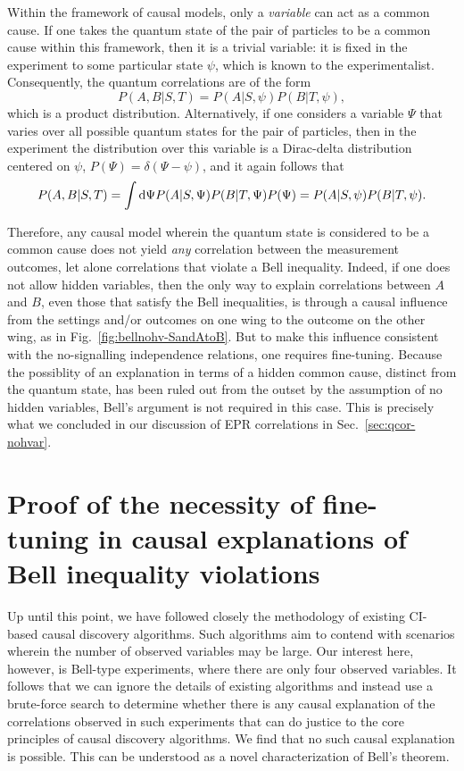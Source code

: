 \documentclass[12pt,onecolumn,nofootinbib]{revtex4-2}
\begin{document}
Within the framework of causal models, only a {\em variable} can act as a common cause. If one takes the quantum state of the pair of particles  to be a common cause within this framework, then it is a trivial variable: it is fixed in the experiment to some particular state $\psi$, which is known to the experimentalist.  Consequently, the quantum correlations are of the form 
\[
P(A,B|S,T)=P(A|S,\psi)P(B|T,\psi),
\]
which is a product distribution.  Alternatively, if one considers a variable $\Psi$ that varies over all possible quantum states for the pair of particles, then in the experiment the distribution over this variable is a Dirac-delta distribution centered on $\psi$, $P(\Psi)=\delta(\Psi-\psi)$, and it again follows that 
\[
P(A,B|S,T)=\int {\rm d}\Psi P(A|S,\Psi)P(B|T,\Psi) P(\Psi)= P(A|S,\psi)P(B|T,\psi).
\]

  Therefore, any causal model wherein the quantum state is considered to be a common cause does not yield {\em any} correlation between the measurement outcomes, let alone correlations that violate a Bell inequality.  
Indeed, if one does not allow hidden variables, then the only way to explain correlations between $A$ and $B$, even those that satisfy the Bell inequalities, is through a causal influence from the settings and/or outcomes on one wing to the outcome on the other wing, as in Fig.~\ref{fig:bellnohv-SandAtoB}.
But to make this influence consistent with the no-signalling independence relations, one requires fine-tuning. 
Because the possiblity of an explanation in terms of a {\rm hidden} common cause, distinct from the quantum state,
 has been ruled out from the outset by the assumption of no hidden variables, Bell's argument is not required in this case.
 This is precisely what we concluded in our discussion of EPR correlations in Sec.~\ref{sec:qcor-nohvar}.  

 
\section{Proof of the necessity of fine-tuning in causal explanations of Bell inequality violations}
\label{sec:theorem}

Up until this point, we have followed closely the methodology of existing CI-based causal discovery algorithms.  
Such algorithms aim to contend with scenarios wherein the number of observed variables may be large.
 Our interest here, however, is Bell-type experiments, where there are only four observed variables.  
 It follows that we can ignore the details of existing algorithms and instead use a brute-force search to determine whether there is any causal explanation of the correlations observed in such experiments that can do justice to the core principles of causal discovery algorithms. 
 We find that no such causal explanation is possible.  This can be understood as a novel characterization of Bell's theorem. 
\end{document}
